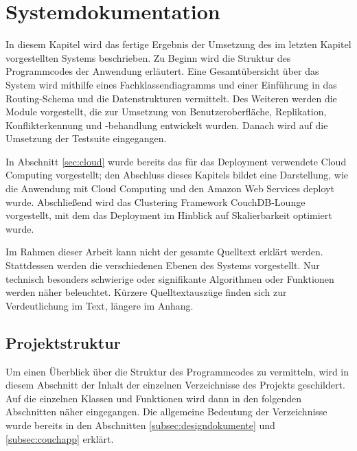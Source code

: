 \chapter{Systemdokumentation}
\label{chap:systemdokumentation}

In diesem Kapitel wird das fertige Ergebnis der Umsetzung des im letzten Kapitel vorgestellten Systems beschrieben. Zu Beginn wird die Struktur des Programmcodes der Anwendung erläutert. Eine Gesamtübersicht über das System wird mithilfe eines Fachklassendiagramms und einer Einführung in das Routing-Schema und die Datenstrukturen vermittelt. Des Weiteren werden die Module vorgestellt, die zur Umsetzung von Benutzeroberfläche, Replikation, Konflikterkennung und -behandlung entwickelt wurden. Danach wird auf die Umsetzung der Testsuite eingegangen. 

In Abschnitt \ref{sec:cloud} wurde bereits das für das Deployment verwendete Cloud Computing vorgestellt; den Abschluss dieses Kapitels bildet eine Darstellung, wie die Anwendung mit Cloud Computing und den Amazon Web Services deployt wurde. Abschließend wird das Clustering Framework CouchDB-Lounge vorgestellt, mit dem das Deployment im Hinblick auf Skalierbarkeit optimiert wurde.

Im Rahmen dieser Arbeit kann nicht der gesamte Quelltext erklärt werden. Stattdessen werden die verschiedenen Ebenen des Systems vorgestellt. Nur technisch besonders schwierige oder signifikante Algorithmen oder Funktionen werden näher beleuchtet. Kürzere Quelltextauszüge finden sich zur Verdeutlichung im Text, längere im Anhang. 



\section{Projektstruktur}

Um einen Überblick über die Struktur des Programmcodes zu vermitteln, wird in diesem Abschnitt der Inhalt der einzelnen Verzeichnisse des Projekts geschildert. Auf die einzelnen Klassen und Funktionen wird dann in den folgenden Abschnitten näher eingegangen. Die allgemeine Bedeutung der Verzeichnisse wurde bereits in den Abschnitten \ref{subsec:designdokumente} und \ref{subsec:couchapp} erklärt.


